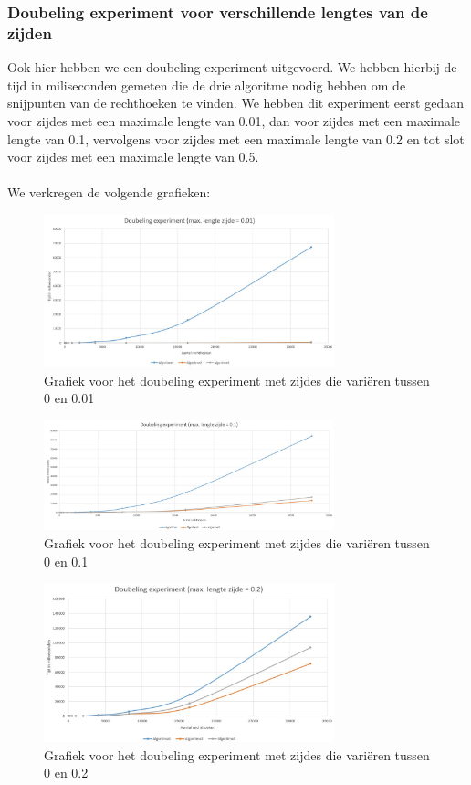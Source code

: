 \documentclass[11pt,a4paper,titlepage]{article}
\begin{document}
			\subsubsection{Doubeling experiment voor verschillende lengtes van de zijden}
				Ook hier hebben we een doubeling experiment uitgevoerd.  We hebben hierbij de tijd in miliseconden gemeten die de drie algoritme nodig hebben om de snijpunten van de rechthoeken te vinden. We hebben dit experiment eerst gedaan voor zijdes met een maximale lengte van 0.01, dan voor zijdes met een maximale lengte van 0.1, vervolgens voor zijdes met een maximale lengte van 0.2 en tot slot voor zijdes met een maximale lengte van 0.5.\\ \\
				We verkregen de volgende grafieken:
				\begin{figure}[H]
				\centering
				\includegraphics[width=0.75\textwidth]{zijde001.JPG}
				\caption{\label{fig:convR}Grafiek voor het doubeling experiment met zijdes die variëren tussen 0 en 0.01}
				\end{figure}
				\begin{figure}[H]
				\centering
				\includegraphics[width=0.75\textwidth]{zijde01.JPG}
				\caption{\label{fig:convR}Grafiek voor het doubeling experiment met zijdes die variëren tussen 0 en 0.1}
				\end{figure}
				\begin{figure}[H]
				\centering
				\includegraphics[width=0.75\textwidth]{zijde02.JPG}
				\caption{\label{fig:convR}Grafiek voor het doubeling experiment met zijdes die variëren tussen 0 en 0.2}
				\end{figure}
\end{document}
